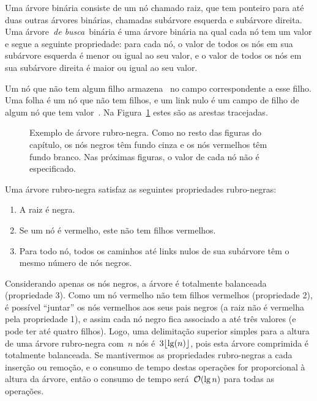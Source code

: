 \documentclass[main.tex]{subfiles}
\begin{document}
Uma árvore binária consiste de um nó chamado raiz, que tem ponteiro para até duas outras árvores binárias, chamadas subárvore esquerda e subárvore direita. Uma árvore~\emph{de busca}~binária é uma árvore binária na qual cada nó tem um valor e segue a seguinte propriedade: para cada nó, o valor de todos os nós em sua subárvore esquerda é menor ou igual ao seu valor, e o valor de todos os nós em sua subárvore direita é maior ou igual ao seu valor.

Um nó que não tem algum filho armazena~ no campo correspondente a esse filho. Uma folha é um nó que não tem filhos, e um link nulo é um campo de filho de algum nó que tem valor~. Na Figura~\ref{fig:arv_bin_ex} estes são as arestas tracejadas.


\begin{figure}
\centering
{}
\caption{Exemplo de árvore rubro-negra. Como no resto das figuras do capítulo, os nós negros têm fundo cinza e os nós vermelhos têm fundo branco. Nas próximas figuras, o valor de cada nó não é especificado.} \label{fig:arv_bin_ex}
\end{figure}

Uma árvore rubro-negra satisfaz as seguintes propriedades rubro-negras:
\begin{enumerate}
\item A raiz é negra.
\item Se um nó é vermelho, este não tem filhos vermelhos.
\item Para todo nó, todos os caminhos até links nulos de sua subárvore têm o mesmo número de nós negros.
\end{enumerate}

Considerando apenas os nós negros, a árvore é totalmente balanceada (propriedade 3). Como um nó vermelho não tem filhos vermelhos (propriedade 2), é possível ``juntar'' os nós vermelhos aos seus pais negros (a raiz não é vermelha pela propriedade 1), e assim cada nó negro fica associado a até três valores (e pode ter até quatro filhos). Logo, uma delimitação superior simples para a altura de uma árvore rubro-negra com~$n$ nós é~$3\lfloor\lg(n)\rfloor$, pois esta árvore comprimida é totalmente balanceada. Se mantivermos as propriedades rubro-negras a cada inserção ou remoção, e o consumo de tempo destas operações for proporcional à altura da árvore, então o consumo de tempo será~$\mathcal{O}(\lg n)$ para todas as operações.
\end{document}

